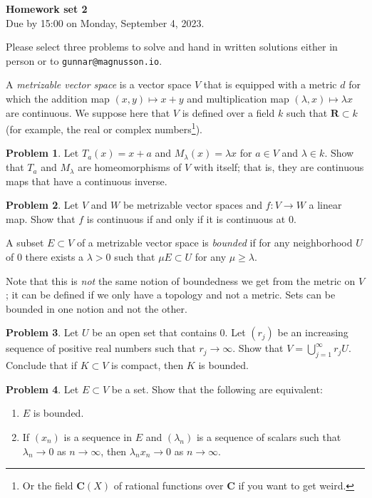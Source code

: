 \documentclass[11pt]{article}
\theoremstyle{definition}
\newtheorem{prob}{Problem}
\newcommand{\kk}[1]{\mathbf{#1}}
\def\head{
\begin{center}
\textbf{\LARGE Homework set 2}
\\[3pt]
Due by 15:00 on Monday, September 4, 2023.
\end{center}
\medskip
}
\begin{document}
\head

Please select three problems to solve and hand in written solutions either in person or to \verb+gunnar@magnusson.io+.

A \emph{metrizable vector space} is a vector space $V$ that is
equipped with a metric $d$ for which the addition map $(x, y) \mapsto x +
y$ and multiplication map $(\lambda, x) \mapsto \lambda x$ are continuous.
We suppose here that $V$ is defined over a field $k$ such that $\kk R \subset k$
(for example, the real or complex numbers\footnote{Or the field $\kk C(X)$ of rational functions over $\kk C$ if you want to get weird.}).


\begin{prob}
Let $T_a(x) = x + a$ and $M_\lambda(x) = \lambda x$ for $a \in V$ and $\lambda
\in k$.
Show that $T_a$ and $M_\lambda$ are homeomorphisms of $V$ with itself; that is,
they are continuous maps that have a continuous inverse.
\end{prob}


\begin{prob}
Let $V$ and $W$ be metrizable vector spaces and $f : V \to W$ a linear map.
Show that $f$ is continuous if and only if it is continuous at $0$.
\end{prob}


A subset $E \subset V$ of a metrizable vector space is \emph{bounded} if for
any neighborhood $U$ of $0$ there exists a $\lambda > 0$ such that $\mu E
\subset U$ for any $\mu \geq \lambda$.

Note that this is \emph{not} the same notion of boundedness we get from the
metric on $V$; it can be defined if we only have a topology and not a metric.
Sets can be bounded in one notion and not the other.


\begin{prob}
Let $U$ be an open set that contains $0$.
Let $(r_j)$ be an increasing sequence of positive real numbers such that $r_j
\to \infty$. Show that $V = \bigcup_{j=1}^\infty r_j U$.
Conclude that if $K \subset V$ is compact, then $K$ is bounded.
\end{prob}

\begin{prob}
Let $E \subset V$ be a set.
Show that the following are equivalent:
\begin{enumerate}
\item
$E$ is bounded.

\item
If $(x_n)$ is a sequence in $E$ and $(\lambda_n)$ is a sequence of scalars such
that $\lambda_n \to 0$ as $n \to \infty$, then $\lambda_n x_n \to 0$ as $n \to
\infty$.
\end{enumerate}
\end{prob}
\end{document}
